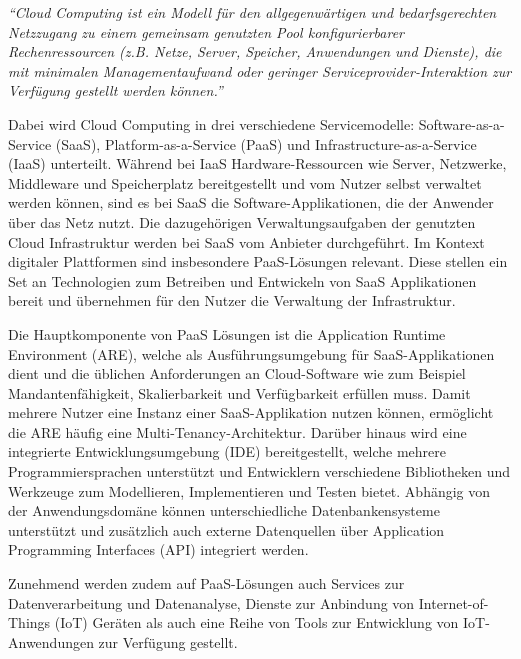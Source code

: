 \begin{center}
    \textit{\enquote{Cloud Computing ist ein Modell für den allgegenwärtigen und bedarfsgerechten Netzzugang zu einem gemeinsam genutzten Pool konfigurierbarer Rechenressourcen (z.B. Netze, Server, Speicher, Anwendungen und Dienste), die mit minimalen Managementaufwand oder geringer Serviceprovider-Interaktion zur Verfügung gestellt werden können.}} \autocite[S. 2]{MELL2011}
\end{center}

Dabei wird Cloud Computing in drei verschiedene Servicemodelle: Software-as-a-Service (SaaS), Platform-as-a-Service (PaaS) und Infrastructure-as-a-Service (IaaS) unterteilt. Während bei IaaS Hardware-Ressourcen wie Server, Netzwerke, Middleware und Speicherplatz bereitgestellt und vom Nutzer selbst verwaltet werden können, sind es bei SaaS die Software-Applikationen, die der Anwender über das Netz nutzt. Die dazugehörigen Verwaltungsaufgaben der genutzten Cloud Infrastruktur werden bei SaaS vom Anbieter durchgeführt. Im Kontext digitaler Plattformen sind insbesondere PaaS-Lösungen relevant.\autocite[Vgl.][S. 2f]{MELL2011} Diese stellen ein Set an Technologien zum Betreiben und Entwickeln von SaaS Applikationen bereit und übernehmen für den Nutzer die Verwaltung der Infrastruktur.\autocite[Vgl.][S. 8]{BRAUNINGER2012}

Die Hauptkomponente von PaaS Lösungen ist die Application Runtime Environment (ARE), welche als Ausführungsumgebung für SaaS-Applikationen dient und die üblichen Anforderungen an Cloud-Software wie zum Beispiel Mandantenfähigkeit, Skalierbarkeit und Verfügbarkeit erfüllen muss. Damit mehrere Nutzer eine Instanz einer SaaS-Applikation nutzen können, ermöglicht die ARE häufig eine Multi-Tenancy-Architektur. Darüber hinaus wird eine integrierte Entwicklungsumgebung (IDE) bereitgestellt, welche mehrere Programmiersprachen unterstützt und Entwicklern verschiedene Bibliotheken und Werkzeuge zum Modellieren, Implementieren und Testen bietet. Abhängig von der Anwendungsdomäne können unterschiedliche Datenbankensysteme unterstützt und zusätzlich auch externe Datenquellen über Application Programming Interfaces (API) integriert werden. \autocite[Vgl.][S. 371]{BEIMBORN2011}

Zunehmend werden zudem auf PaaS-Lösungen auch Services zur Datenverarbeitung und Datenanalyse, Dienste zur Anbindung von Internet-of-Things (IoT) Geräten als auch eine Reihe von Tools zur Entwicklung von IoT-Anwendungen zur Verfügung gestellt. \autocite[Vgl.][]{IBM2023}

